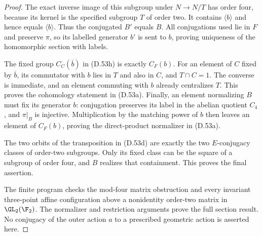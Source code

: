 \begin{proof}
The exact inverse image of this subgroup
under $N\to N/T$ has order four,
because its kernel is the specified
subgroup $T$ of order two.
It contains $\langle b\rangle$ and
hence equals $\langle b\rangle$.
Thus the conjugated $B'$ equals $B$.
All conjugations used lie in $F$ and
preserve $\pi$, so its labelled generator
$b'$ is sent to $b$, proving uniqueness
of the homomorphic section with labels.

The fixed group $C_C(\overline b)$ in
(D.53h) is exactly $C_F(b)$.
For an element of $C$ fixed by
$\overline b$, its commutator with $b$
lies in $T$ and also in $C$, and
$T\cap C=1$.
The converse is immediate, and an
element commuting with $b$ already
centralizes $T$.
This proves the cohomology statement
in (D.53a).
Finally, an element normalizing $B$
must fix its generator $b$: conjugation
preserves its label in the abelian
quotient $C_4$, and $\pi|_B$ is injective.
Multiplication by the matching power
of $b$ then leaves an element of
$C_F(b)$, proving the direct-product
normalizer in (D.53a).

The two orbits of the transposition
in (D.53d) are exactly the two
$E$-conjugacy classes of order-two
subgroups. Only its fixed class can
be the square of a subgroup of order
four, and $B$ realizes that containment.
This proves the final assertion.

The finite program
checks the mod-four matrix obstruction
and every invariant three-point affine
configuration above a nonidentity
order-two matrix in $\GL_2(\F_2)$.
The normalizer and restriction arguments
prove the full section result.
No conjugacy of the outer action $a$
to a prescribed geometric action is
asserted here.
\end{proof}
